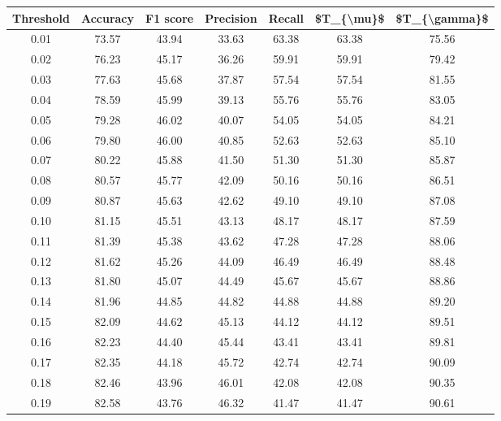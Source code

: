 \begin{tabular}{|c|c|c|c|c|c|c|}
\hline
 Threshold &  Accuracy &  F1 score &  Precision &  Recall &  \$T\_\{\textbackslash mu\}\$ &  \$T\_\{\textbackslash gamma\}\$ \\
\hline
      0.01 &     73.57 &     43.94 &      33.63 &   63.38 &      63.38 &         75.56 \\
      0.02 &     76.23 &     45.17 &      36.26 &   59.91 &      59.91 &         79.42 \\
      0.03 &     77.63 &     45.68 &      37.87 &   57.54 &      57.54 &         81.55 \\
      0.04 &     78.59 &     45.99 &      39.13 &   55.76 &      55.76 &         83.05 \\
      0.05 &     79.28 &     46.02 &      40.07 &   54.05 &      54.05 &         84.21 \\
      0.06 &     79.80 &     46.00 &      40.85 &   52.63 &      52.63 &         85.10 \\
      0.07 &     80.22 &     45.88 &      41.50 &   51.30 &      51.30 &         85.87 \\
      0.08 &     80.57 &     45.77 &      42.09 &   50.16 &      50.16 &         86.51 \\
      0.09 &     80.87 &     45.63 &      42.62 &   49.10 &      49.10 &         87.08 \\
      0.10 &     81.15 &     45.51 &      43.13 &   48.17 &      48.17 &         87.59 \\
      0.11 &     81.39 &     45.38 &      43.62 &   47.28 &      47.28 &         88.06 \\
      0.12 &     81.62 &     45.26 &      44.09 &   46.49 &      46.49 &         88.48 \\
      0.13 &     81.80 &     45.07 &      44.49 &   45.67 &      45.67 &         88.86 \\
      0.14 &     81.96 &     44.85 &      44.82 &   44.88 &      44.88 &         89.20 \\
      0.15 &     82.09 &     44.62 &      45.13 &   44.12 &      44.12 &         89.51 \\
      0.16 &     82.23 &     44.40 &      45.44 &   43.41 &      43.41 &         89.81 \\
      0.17 &     82.35 &     44.18 &      45.72 &   42.74 &      42.74 &         90.09 \\
      0.18 &     82.46 &     43.96 &      46.01 &   42.08 &      42.08 &         90.35 \\
      0.19 &     82.58 &     43.76 &      46.32 &   41.47 &      41.47 &         90.61 \\

\end{tabular}
